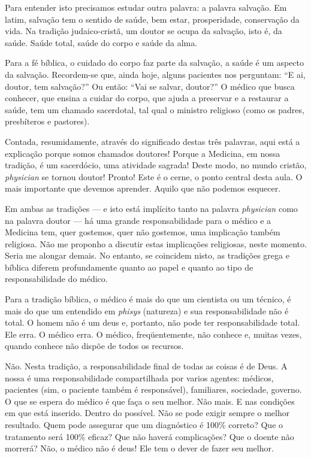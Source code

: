 \documentclass[pdftex, brazil, 12pt, oneside]{article}
\newcommand{\ingles}[1]{\textit{#1}}
\begin{document}
Para entender isto precisamos estudar outra palavra: a palavra salvação. Em latim, salvação
tem o sentido de saúde, bem estar, prosperidade, conservação da vida. Na tradição judaico-cristã,
um doutor se ocupa da salvação, isto é, da saúde. Saúde total, saúde do corpo e saúde da alma.

Para a fé bíblica, o cuidado do corpo faz parte da salvação, a saúde é um aspecto da salvação.
Recordem-se que, ainda hoje, alguns pacientes nos perguntam: ``E ai, doutor, tem salvação?''
Ou então: ``Vai se salvar, doutor?'' O médico que busca conhecer, que ensina a cuidar do corpo,
que ajuda a preservar e a restaurar a saúde, tem um chamado sacerdotal, tal qual o ministro
religioso (como os padres, presbíteros e pastores).

Contada, resumidamente, através do significado destas três palavras, aqui está a explicação porque
somos chamados doutores! Porque a Medicina, em nossa tradição, é um sacerdócio, uma atividade sagrada!
Deste modo, no mundo cristão, \ingles{physician} se tornou doutor! Pronto! Este é o cerne,
o ponto central desta aula. O mais importante que devemos aprender. Aquilo que não podemos esquecer.

Em ambas as tradições --- e isto está implícito tanto na palavra \ingles{physician} como na palavra
doutor --- há uma grande responsabilidade para o médico e a Medicina tem, quer gostemos, quer não
gostemos, uma implicação também religiosa. Não me proponho a discutir estas implicações religiosas,
neste momento. Seria me alongar demais. No entanto, se coincidem nisto, as tradições grega e bíblica
diferem profundamente quanto ao papel e quanto ao tipo de responsabilidade do médico.

Para a tradição bíblica, o médico é mais do
que um cientista ou um técnico, é mais do que um entendido em \ingles{phisys} (natureza) e sua
responsabilidade não é total. O homem não é um deus e, portanto, não pode ter responsabilidade total.
Ele erra. O médico erra. O médico, freqüentemente, não conhece e, muitas vezes, quando conhece não
dispõe de todos os recursos.

Não. Nesta tradição, a responsabilidade final de todas as coisas é de Deus. A nossa é uma
responsabilidade compartilhada por varios agentes: médicos, pacientes (sim, o paciente também é
responsável), familiares, sociedade, governo. O que se espera do médico é que faça o seu melhor.
Não mais. E nas condições em que está inserido. Dentro do possível. Não se pode exigir sempre o melhor
resultado. Quem pode assegurar que um diagnóstico é 100\% correto? Que o tratamento será 100\% eficaz?
Que não haverá complicações? Que o doente não morrerá? Não, o médico não é deus! Ele tem o dever
de fazer seu melhor.
\end{document}
